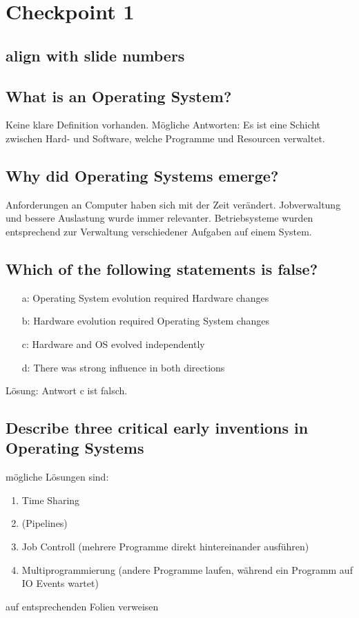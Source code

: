 \section{Checkpoint 1}

\subsection{align with slide numbers}

\subsection{What is an Operating System?}
Keine klare Definition vorhanden.
Mögliche Antworten:
Es ist eine Schicht zwischen Hard- und Software, welche Programme und Resourcen verwaltet.

\subsection{Why did Operating Systems emerge?}
Anforderungen an Computer haben sich mit der Zeit verändert.
Jobverwaltung und bessere Auslastung wurde immer relevanter.
Betriebsysteme wurden entsprechend zur Verwaltung verschiedener Aufgaben auf einem System.

\subsection{Which of the following statements is false?}
\begin{enumerate}
    \item[a:] Operating System evolution required Hardware changes
    \item[b:] Hardware evolution required Operating System changes
    \item[c:] Hardware and OS evolved independently
    \item[d:] There was strong influence in both directions 
\end{enumerate}

Lösung: Antwort c ist falsch.

\subsection{Describe three critical early inventions in Operating Systems}
mögliche Lösungen sind:
\begin{enumerate}
    \item Time Sharing
    \item (Pipelines)
    \item Job Controll (mehrere Programme direkt hintereinander ausführen)
    \item Multiprogrammierung (andere Programme laufen, während ein Programm auf IO Events wartet)
\end{enumerate}
\todo auf entsprechenden Folien verweisen

